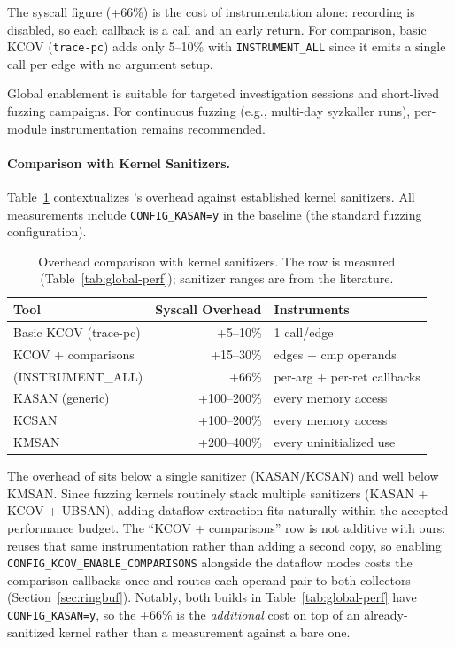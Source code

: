 \documentclass{article}
\begin{document}
The syscall figure (+66\%) is the cost of instrumentation alone: recording is
disabled, so each callback is a call and an early return. For
comparison, basic KCOV (\texttt{trace-pc}) adds only 5--10\% with
\texttt{INSTRUMENT\_ALL} since it emits a single call per edge with no argument
setup.

Global enablement is suitable for targeted investigation sessions and
short-lived fuzzing campaigns. For continuous fuzzing (e.g., multi-day
syzkaller runs), per-module instrumentation remains recommended.

\paragraph{Comparison with Kernel Sanitizers.}
Table~\ref{tab:sanitizer-cmp} contextualizes \toolname{}'s overhead against
established kernel sanitizers. All measurements include
\texttt{CONFIG\_KASAN=y} in the baseline (the standard fuzzing configuration).

\begin{table}[htbp]
\centering
\caption{Overhead comparison with kernel sanitizers. The \toolname{} row is measured (Table~\ref{tab:global-perf}); sanitizer ranges are from the literature.}\label{tab:sanitizer-cmp}
\small
\begin{tabular}{@{}lrl@{}}
\toprule
\textbf{Tool} & \textbf{Syscall Overhead} & \textbf{Instruments} \\
\midrule
Basic KCOV (trace-pc)       & +5--10\%   & 1 call/edge \\
KCOV + comparisons          & +15--30\%  & edges + cmp operands \\
\toolname{} (INSTRUMENT\_ALL) & +66\%    & per-arg + per-ret callbacks \\
KASAN (generic)             & +100--200\% & every memory access \\
KCSAN                       & +100--200\% & every memory access \\
KMSAN                       & +200--400\% & every uninitialized use \\
\bottomrule
\end{tabular}
\end{table}

\noindent The overhead of \toolname{} sits below a single
sanitizer (KASAN/KCSAN) and well below KMSAN. Since fuzzing kernels
routinely stack multiple sanitizers (KASAN + KCOV + UBSAN), adding dataflow
extraction fits naturally within the accepted performance budget.
The ``KCOV + comparisons'' row is not additive with ours: \toolname{} reuses
that same instrumentation rather than adding a second copy, so enabling
\texttt{CONFIG\_KCOV\_ENABLE\_COMPARISONS} alongside the dataflow modes costs
the comparison callbacks once and routes each operand pair to both collectors
(Section~\ref{sec:ringbuf}).
Notably, both builds in Table~\ref{tab:global-perf} have
\texttt{CONFIG\_KASAN=y}, so the +66\% is the \emph{additional} cost on top of
an already-sanitized kernel rather than a measurement against a bare one.
\end{document}
